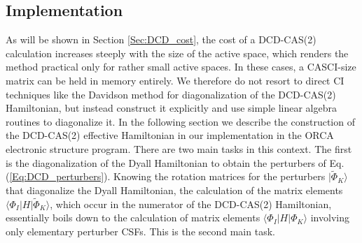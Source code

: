 \subsection{Implementation}
As will be shown in Section \ref{Sec:DCD_cost}, the cost of a DCD-CAS(2) calculation increases steeply with the size of the active space, which renders the method practical only for rather small active spaces. In these cases, a CASCI-size matrix can be held in memory entirely. We therefore do not resort to direct CI techniques like the Davidson method\cite{David_1975_87} for diagonalization of the DCD-CAS(2) Hamiltonian, but instead construct it explicitly and use simple linear algebra routines to diagonalize it.
In the following section we describe the construction of the DCD-CAS(2) effective Hamiltonian in our implementation in the ORCA electronic structure program.\cite{Neese_2018_1327} There are two main tasks in this context. The first is the diagonalization of the Dyall Hamiltonian to obtain the perturbers of Eq. (\ref{Eq:DCD_perturbers}). 
Knowing the rotation matrices for the perturbers $|\tilde{\Phi}_K\rangle$ that diagonalize the Dyall Hamiltonian, the calculation of the matrix elements $\langle {\Phi _I^{}|H|\tilde \Phi _K^{}} \rangle $, which occur in the numerator of the DCD-CAS(2) Hamiltonian, essentially boils down to the calculation of matrix elements $\langle {\Phi _I^{}|H|\Phi _K^{}} \rangle $ involving only elementary perturber CSFs. This is the second main task. 
 
